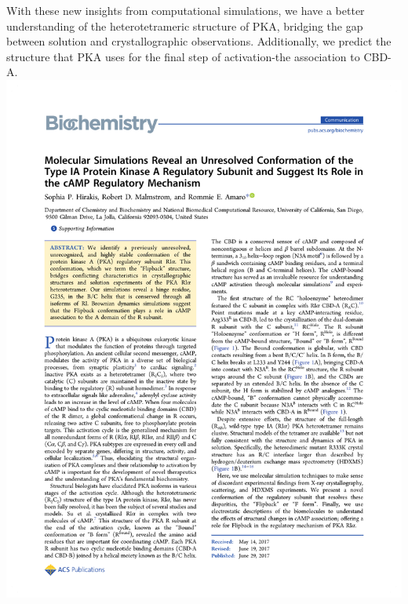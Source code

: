 \documentclass[12pt]{ucsddissertation}
\begin{document}
With these new insights from computational simulations, we have a better understanding of the heterotetrameric structure of PKA, bridging the gap between solution and crystallographic observations. Additionally, we predict the structure that PKA uses for the final step of activation-the association to CBD-A.   \\
\includegraphics[height=1\textheight]{Flipback_Paper_Chapter3.pdf}

\end{document}
